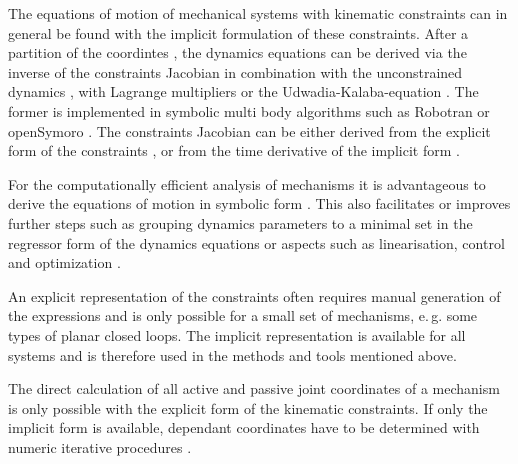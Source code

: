 \documentclass[twocolumn,10pt]{IFTOMM}
\begin{document}
The equations of motion of mechanical systems with kinematic constraints can in general be found with the implicit formulation of these constraints.
After a partition of the coordintes \cite{WehageHau1982}, the dynamics equations can be derived via the inverse of the constraints Jacobian in combination with the unconstrained dynamics \cite{NakamuraGho1989}, with Lagrange multipliers \cite{WehageHau1982,LuhZhe1985} or the Udwadia-Kalaba-equation \cite{UdwadiaKal1992}.
The former is implemented in symbolic multi body algorithms such as Robotran \cite{SaminFis2013} or openSymoro \cite{KhalilVijKhoMuk2014}.
The constraints Jacobian can be either derived from the explicit form of the constraints \cite{NakamuraGho1989}, or from the time derivative of the implicit form \cite{ParkChoPlo1999}.

For the computationally efficient analysis of mechanisms it is advantageous to derive the equations of motion in symbolic form \cite{SaminFis2013}.
This also facilitates or improves further steps such as grouping dynamics parameters to a minimal set  in the regressor form of the dynamics equations \cite{KhalilBen1995} or aspects such as linearisation, control and optimization \cite{ParkChoPlo1999}.


An explicit representation of the constraints often requires manual generation of the expressions and is only possible for a small set of mechanisms, e.\,g. some types of planar closed loops.
The implicit representation is available for all systems and is therefore used in the methods and tools mentioned above.


The direct calculation of all active and passive joint coordinates of a mechanism is only possible with the explicit form of the kinematic constraints.
If only the implicit form is available, dependant coordinates have to be determined with numeric iterative procedures \cite{ParkChoPlo1999}.
\end{document}
